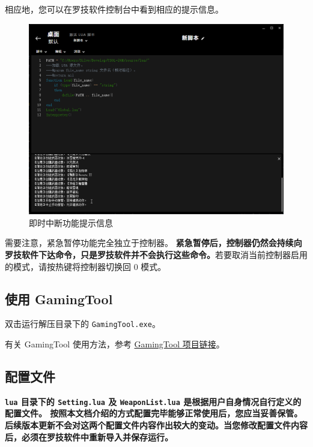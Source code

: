 相应地，您可以在罗技软件控制台中看到相应的提示信息。

\begin{figure}[H]
    \Centering
    \includegraphics[width=\textwidth]{docs/assets/interrupt.png}
    \caption{即时中断功能提示信息}
\end{figure}

需要注意，紧急暂停功能完全独立于控制器。
\textbf{\color{red}紧急暂停后，控制器仍然会持续向罗技软件下达命令，只是罗技软件并不会执行这些命令。}若要取消当前控制器启用的模式，请按热键将控制器切换回 0 模式。

\subsection{使用 GamingTool}

双击运行解压目录下的 \lstinline{GamingTool.exe}。

有关 GamingTool 使用方法，参考 \href{https://gitee.com/silver1867/gaming-tool}{GamingTool 项目链接}。

\subsection{配置文件}

\textbf{\color{red}\lstinline{lua} 目录下的 \lstinline{Setting.lua} 及 \lstinline{WeaponList.lua} 是根据用户自身情况自行定义的配置文件。
按照本文档介绍的方式配置完毕能够正常使用后，您应当妥善保管。后续版本更新不会对这两个配置文件内容作出较大的变动。当您修改配置文件内容后，必须在罗技软件中重新导入并保存运行。}
